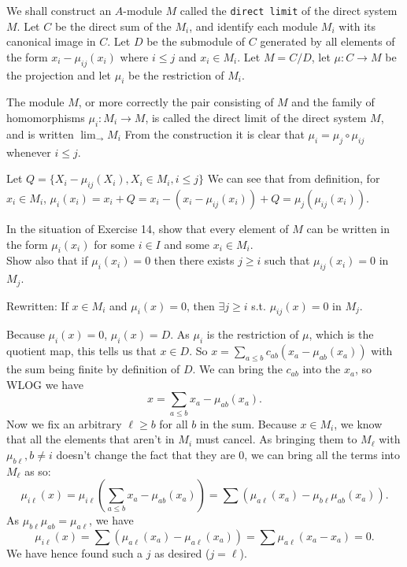 \begin{questions}
	We shall construct an $A$-module $M$ called the \texttt{direct limit} of the direct system $M$. Let $C$ be the direct sum of the $M_i $, and identify each module $M_i$ with its canonical image in $C$. Let $D$ be the submodule of $C$ generated by all elements of the form $x_i - \mu _{ij}(x_i)$ where $i\le j$ and $x_i\in M_i$. Let $M = C / D $, let $\mu :C\to M$ be the projection and let $\mu _i$ be the restriction of $M_i$.

	The module $M $, or more correctly the pair consisting of $M$ and the family of homomorphisms $\mu _i:M_i \to M $, is called the direct limit of the direct system $M $, and is written $\lim_{\rightarrow} M_i$ From the construction it is clear that $\mu _i = \mu _j \circ \mu _{ij}$ whenever $i\le j$.
	\begin{solution}
		Let $Q = \{X_i - \mu _{ij}(X_i), X_i \in M_i, i\le j\}$
		We can see that from definition, for $x_i \in M_i $, $\mu _i(x_i) = x_i + Q = x_i - (x_i - \mu_{ij}(x_i)) + Q = \mu_j(\mu_{ij}(x_i))$.
	\end{solution}

	\question In the situation of Exercise 14, show that every element of $M$ can be written in the form $\mu _i(x_i)$ for some $i\in I$ and some $x_i\in M_i$.\\
	Show also that if $\mu _i(x_i) = 0$ then there exists $j \ge i$ such that $\mu _{ij}(x_i) = 0$ in $M_j$.

	Rewritten: If $x\in M_i $ and $\mu _i(x) = 0 $, then $\exists j \ge i $ s.t. $\mu _{ij}(x) = 0 $ in $M_j $.
	\begin{solution}
		Because $\mu _i(x) = 0 $, $\mu _i(x) = D $.
		As $\mu _i $ is the restriction of $\mu  $, which is the quotient map, this tells us that $x \in D$.
		So $x =\sum_{a \le b} c_{ab}(x_a - \mu_{ab}(x_a))$ with the sum being finite by definition of $D$.
		We can bring the $c_{ab} $ into the $x_a $, so WLOG we have
		\[
			x = \sum_{a\le b} x_a - \mu _{ab}(x_a)
		.\] 
		Now we fix an arbitrary $\ell \ge b $ for all $b $ in the sum.
		Because $x \in M_i $, we know that all the elements that aren't in $M_i $ must cancel.
		As bringing them to $M_\ell $ with $\mu _{b\ell}, b\ne i$ doesn't change the fact that they are 0, we can bring all the terms into $M_{\ell} $ as so:
		\[
			\mu _{i\ell}(x) = \mu_{i\ell}(\sum_{a\le b} x_a - \mu _{ab}(x_a)) =\sum (\mu _{a\ell}(x_a) - \mu _{b\ell}\mu _{ab}(x_a))
		.\] 
		As $\mu _{b\ell} \mu _{ab} = \mu _{a\ell}$, we have
		\[
			\mu_{i\ell}(x) = \sum (\mu _{a\ell}(x_a) - \mu_{a\ell}(x_a)) = \sum \mu _{a\ell}(x_a-x_a) = 0
		.\] 
		We have hence found such a $j $ as desired ($j=\ell $).


\end{solution}
\end{questions}
